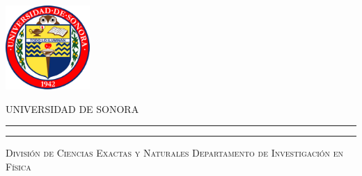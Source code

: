 \thispagestyle{empty} %
%
%
%
%
%
%
%
%
%
%
%
%
%
%
%
%
\begin{minipage}[c][0.15\textheight][c]{0.25\textwidth}
    \begin{center}
        \includegraphics[height=3.2cm, keepaspectratio=true]{unison-logo.png} %
    \end{center}
\end{minipage}
%
%
%
%
%
%
%
%
%
%
%
%
%
%
%
\begin{minipage}[c][0.17\textheight][t]{0.7\textwidth}
    \begin{center}
        {\scshape\LARGE UNIVERSIDAD DE SONORA} %
        \vspace{.5cm}   %
        \hrule height2.5pt  %
        \vspace{.1cm}    %
        \hrule height1pt  %
        \vspace{.4cm}   %
        {\scshape \large Divisi\'on de Ciencias Exactas y Naturales}
        {\scshape Departamento de Investigaci\'on en F\'isica} %
    \end{center}
\end{minipage}
%
%
%
%
%
%
%
%
%
%
%
%
%
%
%
%
%
%
%
%

